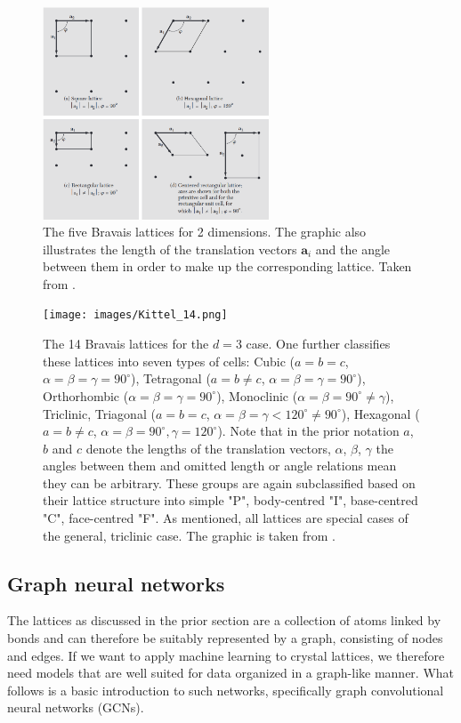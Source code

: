 \documentclass[11pt,a4paper]{article}
\begin{document}
\begin{figure}[htbp]
    \centering
    \includegraphics[width=0.6\textwidth]{images/Kittel_7.png}
    \caption{The five Bravais lattices for 2 dimensions. The graphic also illustrates the length of the translation vectors $\bm{a}_i$ and the angle between them in order to make up the corresponding lattice. Taken from \cite[Fig. 7]{kittelChapter1Crystal2005}.}
    \label{fig:bravais2D}
\end{figure}

\begin{figure}[htbp]
    \centering
    \texttt{[image: images/Kittel\_14.png]}
    \caption{The 14 Bravais lattices for the $d=3$ case. 
    One further classifies these lattices into seven types of cells: Cubic ($a{=}b{=}c$, $\alpha {=} \beta {=} \gamma{=}90^\circ$), Tetragonal ($a{=}b {\neq} c$, $\alpha {=} \beta {=} \gamma{=}90^\circ$), Orthorhombic ($\alpha {=} \beta {=} \gamma{=} 90^\circ$), Monoclinic ($\alpha {=} \beta{=}90^\circ {\neq} \gamma$), Triclinic, Triagonal ($a{=}b{=}c$, $\alpha {=} \beta {=} \gamma <120^\circ {\neq} 90^\circ$), Hexagonal ($a{=}b{\neq} c$, $\alpha {=} \beta{=} 90^\circ, \gamma{=} 120^\circ$). 
    Note that in the prior notation $a$, $b$ and $c$ denote the lengths of the translation vectors, $\alpha$, $\beta$, $\gamma$ the angles between them and omitted length or angle relations mean they can be arbitrary. 
    These groups are again subclassified based on their lattice structure into simple "P", body-centred "I", base-centred "C", face-centred "F". 
    As mentioned, all lattices are special cases of the general, triclinic case. The graphic is taken from \cite[Fig. 14]{kittelChapter1Crystal1971}.}
    \label{fig:bravais3D}
\end{figure}

\subsection{Graph neural networks}
\label{ssec:Graph neural networks}
The lattices as discussed in the prior section are a collection of atoms linked by bonds and can therefore be suitably represented by a graph, consisting of nodes and edges. 
If we want to apply machine learning to crystal lattices, we therefore need models that are well suited for data organized in a graph-like manner. 
What follows is a basic introduction to such networks, specifically graph convolutional neural networks (GCNs). \\
\end{document}
